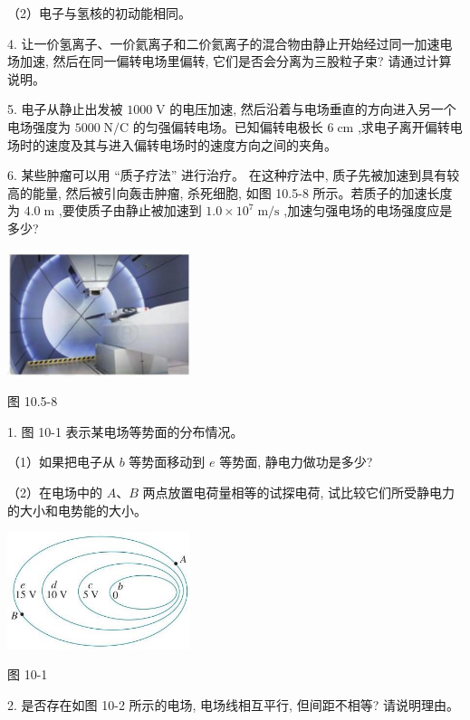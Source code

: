 \documentclass[10pt]{article}
\begin{document}
（2）电子与氢核的初动能相同。

4. 让一价氢离子、一价氦离子和二价氦离子的混合物由静止开始经过同一加速电场加速, 然后在同一偏转电场里偏转, 它们是否会分离为三股粒子束? 请通过计算说明。

5. 电子从静止出发被 \({1000}\mathrm{\;V}\) 的电压加速, 然后沿着与电场垂直的方向进入另一个电场强度为 \({5000}\mathrm{\;N}/\mathrm{C}\) 的匀强偏转电场。已知偏转电极长 \(6\mathrm{\;{cm}}\) ,求电子离开偏转电场时的速度及其与进入偏转电场时的速度方向之间的夹角。

6. 某些肿瘤可以用 “质子疗法” 进行治疗。 在这种疗法中, 质子先被加速到具有较高的能量, 然后被引向轰击肿瘤, 杀死细胞, 如图 10.5-8 所示。若质子的加速长度为 \({4.0}\mathrm{\;m}\) ,要使质子由静止被加速到 \({1.0} \times {10}^{7}\mathrm{\;m}/\mathrm{s}\) ,加速匀强电场的电场强度应是多少?

\begin{center}
\includegraphics[max width=0.4\textwidth]{images/01911d5f-8e38-70c0-b5b8-2b399bd115b6_54_407150.jpg}
\end{center}

图 10.5-8

1. 图 10-1 表示某电场等势面的分布情况。

（1）如果把电子从 \(b\) 等势面移动到 \(e\) 等势面, 静电力做功是多少?

（2）在电场中的 \(A\text{、}B\) 两点放置电荷量相等的试探电荷, 试比较它们所受静电力的大小和电势能的大小。

\begin{center}
\includegraphics[max width=0.4\textwidth]{images/01911d5f-8e38-70c0-b5b8-2b399bd115b6_55_873934.jpg}
\end{center}

图 10-1

2. 是否存在如图 10-2 所示的电场, 电场线相互平行, 但间距不相等? 请说明理由。
\end{document}
